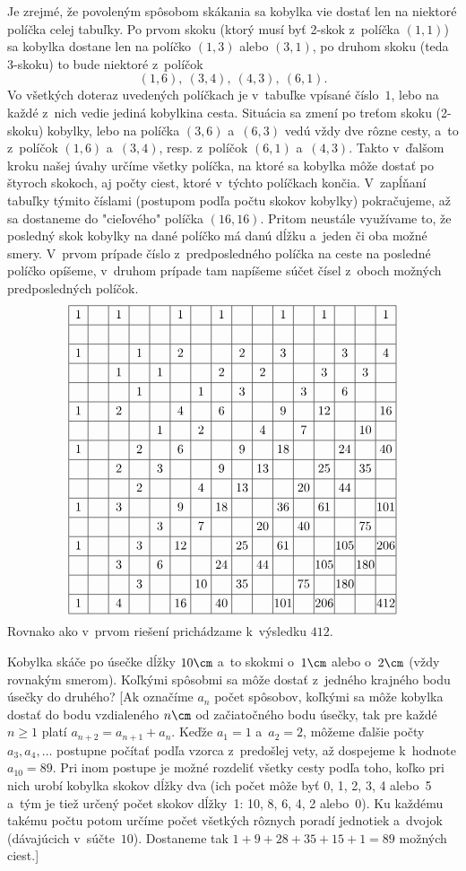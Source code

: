 {Je zrejmé, že povoleným spôsobom skákania sa kobylka vie dostať len na
niektoré políčka celej tabuľky. Po prvom skoku (ktorý musí byť
2-skok z~políčka $(1, 1)$) sa kobylka dostane len na políčko $(1, 3)$
alebo $(3, 1)$, po druhom skoku (teda 3-skoku) to bude niektoré
z~políčok
$$
(1, 6),\ (3, 4),\ (4, 3),\ (6, 1).
$$
Vo všetkých doteraz uvedených políčkach je v~tabuľke vpísané číslo~$1$,
lebo na každé z~nich vedie jediná kobylkina cesta. Situácia sa
zmení po treťom skoku (2-skoku) kobylky, lebo na políčka $(3, 6)$
a~$(6, 3)$ vedú vždy dve rôzne cesty, a~to z~políčok $(1, 6)$ a~$(3, 4)$, resp.
z~políčok $(6, 1)$ a~$(4, 3)$.
Takto v~ďalšom kroku našej úvahy určíme všetky políčka, na ktoré
sa kobylka môže dostať po štyroch skokoch, aj počty ciest, ktoré
v~týchto políčkach končia. V~zapĺňaní tabuľky týmito číslami
(postupom podľa počtu skokov kobylky) pokračujeme,
až sa dostaneme do "cieľového" políčka $(16, 16)$. Pritom
neustále využívame to, že posledný
skok kobylky na dané políčko má danú dĺžku a~jeden či oba možné
smery. V~prvom prípade číslo z~predposledného políčka na ceste
na posledné políčko opíšeme, v~druhom prípade tam napíšeme
súčet čísel z~oboch možných predposledných políčok.
$$
\vbox{\offinterlineskip \everycr{\noalign{\hrule}}
       \halign{\vrule height1em depth.5em\hbox to 1.5em{\hss$#$\hss}\vrule
                &&\hbox to 1.6em{\hss$#$\hss}\vrule\cr
 1& &1& & & 1&  & 1&  &  &  1&  &  1&   &   &  1\cr
  & & & & &  &  &  &  &  &   &  &   &   &   &   \cr
 1& & &1& & 2&  &  & 2&  &  3&  &   &  3&   &  4\cr
  & &1& &1&  &  & 2&  & 2&   &  &  3&   &  3&   \cr
  & & &1& &  & 1&  & 3&  &   & 3&   &  6&   &   \cr
 1& &2& & & 4&  & 6&  &  &  9&  & 12&   &   & 16\cr
  & & & &1&  & 2&  &  & 4&   & 7&   &   & 10&   \cr
 1& & &2& & 6&  &  & 9&  & 18&  &   & 24&   & 40\cr
  & &2& &3&  &  & 9&  &13&   &  & 25&   & 35&   \cr
  & & &2& &  & 4&  &13&  &   &20&   & 44&   &   \cr
 1& &3& & & 9&  &18&  &  & 36&  & 61&   &   &101\cr
  & & & &3&  & 7&  &  &20&   &40&   &   & 75&   \cr
 1& & &3& &12&  &  &25&  & 61&  &   &105&   &206\cr
  & &3& &6&  &  &24&  &44&   &  &105&   &180&   \cr
  & & &3& &  &10&  &35&  &   &75&   &180&   &   \cr
 1& &4& & &16&  &40&  &  &101&  &206&   &   &412\cr
}}
$$
Rovnako ako v~prvom riešení prichádzame k~výsledku $412$.



Kobylka skáče po úsečke dĺžky $10\cm$ a~to skokmi o~$1\cm$ alebo
o~$2\cm$ (vždy rovnakým smerom). Koľkými spôsobmi sa môže dostať z~jedného
krajného bodu úsečky do druhého? [Ak označíme $a_n$ počet spôsobov, koľkými
sa môže kobylka dostať do bodu vzdialeného $n\cm$ od začiatočného bodu
úsečky, tak pre každé $n\ge1$ platí $a_{n+2}=a_{n+1}+a_n$.
Keďže $a_1=1$ a~$a_2=2$, môžeme ďalšie počty $a_3,a_4,\dots$
postupne počítať podľa vzorca
z~predošlej vety, až dospejeme k~hodnote $a_{10}=89$.
Pri inom postupe je možné rozdeliť všetky cesty podľa toho,
koľko pri nich urobí kobylka skokov dĺžky dva
(ich počet môže byť 0, 1, 2, 3, 4 alebo~5 a~tým je tiež
určený počet skokov dĺžky~1: 10, 8, 6, 4, 2 alebo~0).
Ku každému takému počtu potom
určíme počet všetkých rôznych poradí jednotiek a~dvojok (dávajúcich v~súčte~$10$).
Dostaneme tak $1+9+28+35+15+1=89$ možných ciest.]

}

